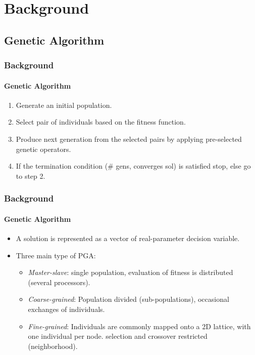 \section{Background}
\subsection{Genetic Algorithm}
\frame
{
\frametitle{Background}
\framesubtitle{Genetic Algorithm}
\begin{enumerate}
	\item Generate an initial population.
	\item Select pair of individuals based on the fitness function.
	\item Produce next generation from the selected pairs by applying pre-selected genetic operators.
	\item If the termination condition (\# gens, converges sol) is satisfied stop, else go to step 2.
\end{enumerate}
}

\frame
{
\frametitle{Background}
\framesubtitle{Genetic Algorithm}
\begin{itemize}
	\item A solution is represented as a vector of real-parameter decision variable.
	\item Three main type of PGA:
	\begin{itemize}
		\item \emph{Master-slave}:
			single population, evaluation of fitness is distributed (several processors).
		\item \emph{Coarse-grained}:
			Population divided (sub-populations), occasional exchanges of individuals.
		\item \emph{Fine-grained}:
			Individuals are commonly mapped onto a 2D lattice, with one individual per node.
			selection and crossover restricted (neighborhood).
	\end{itemize}
\end{itemize}
}
